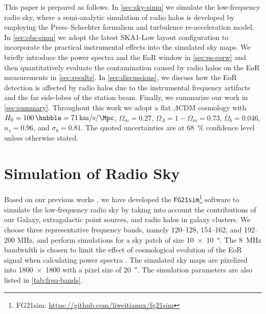 \documentclass[twocolumn]{aastex62}
\newcommand{\lcdm}{$\Lambda$CDM}
\newcommand{\editone}[1]{{\leavevmode\color{cyan}#1}}
\begin{document}
This paper is prepared as follows.
In \autoref{sec:sky-simu} we simulate the low-frequency radio sky, where a
\editone{semi-analytic} simulation of radio halos is developed by employing
the Press--Schechter formalism and turbulence re-acceleration model.
In \autoref{sec:obs-simu} we adopt the latest SKA1-Low layout
configuration to incorporate the practical instrumental effects into
the simulated sky maps.
We briefly introduce the power spectra and the EoR window in
\autoref{sec:ps-eorw}
and then quantitatively evaluate the contamination caused by radio halos
on the EoR measurements in \autoref{sec:results}.
In \autoref{sec:discussions}, we discuss how the EoR detection is
affected by radio halos due to the instrumental frequency artifacts
and the far side-lobes of the station beam.
Finally, we summarize our work in \autoref{sec:summary}.
Throughout this work we adopt a flat \lcdm{} cosmology with
$H_0 = \SI{100}{\hubble} = \SI{71}{\km\per\second\per\Mpc}$,
$\Omega_m = 0.27$, $\Omega_{\Lambda} = 1 - \Omega_m = 0.73$,
$\Omega_b = 0.046$, $n_s = 0.96$, and $\sigma_8 = 0.81$.
The quoted uncertainties are at \SI{68}{\percent} confidence level unless
otherwise stated.


\section{Simulation of Radio Sky}
\label{sec:sky-simu}

Based on our previous works \citep{wang2010,wang2013}, we have developed
the \texttt{FG21sim}\footnote{%
  FG21sim: \url{https://github.com/liweitianux/fg21sim}}
software to simulate the low-frequency
radio sky by taking into account the contributions of our Galaxy,
extragalactic point sources, and radio halos in galaxy clusters.
We choose three representative frequency bands, namely
\numrange{120}{128}, \numrange{154}{162}, and \numrange{192}{200}
\si{\MHz}, and perform simulations for a sky patch of size
\SI[product-units=repeat]{10 x 10}{\degree}.
The \SI{8}{\MHz} bandwidth is chosen to limit the effect of
cosmological evolution of the EoR signal when calculating power
spectra \citep[e.g.][]{wyithe2004,thyagarajan2013}.
The simulated sky maps are pixelized into \num{1800 x 1800} with a pixel
size of \SI{20}{\arcsecond}.
The simulation parameters are also listed in \autoref{tab:freq-bands}.
\end{document}
